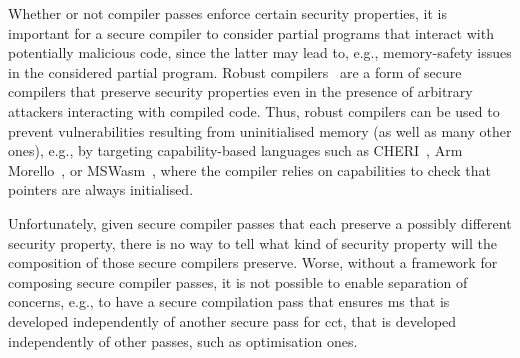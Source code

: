 \documentclass[dvipsnames,conference]{IEEEtran}
\theoremstyle{definition}
\begin{document}
Whether or not compiler passes enforce certain security properties, it is important for a secure compiler to consider partial programs that interact with potentially malicious code, since the latter may lead to, e.g., memory-safety issues in the considered partial program.
Robust compilers~\cite{abate2019jour} are a form of secure compilers that preserve security properties even in the presence of arbitrary attackers interacting with compiled code.
Thus, robust compilers can be used to prevent vulnerabilities resulting from uninitialised memory (as well as many other ones), e.g., by targeting capability-based languages such as CHERI~\cite{woodruff2014CHERI}, Arm Morello~\cite{arm-morello}, or MSWasm~\cite{michael2023mswasm}, where the compiler relies on capabilities to check that pointers are always initialised.


Unfortunately, given secure compiler passes that each preserve a possibly different security property, there is no way to tell what kind of security property will the composition of those secure compilers preserve.
Worse, without a framework for composing secure compiler passes, it is not possible to enable separation of concerns, e.g., to have a secure compilation pass that ensures \gls*{ms} that is developed independently of another secure pass for \gls*{cct}, that is developed independently of other passes, such as optimisation ones.
\end{document}
